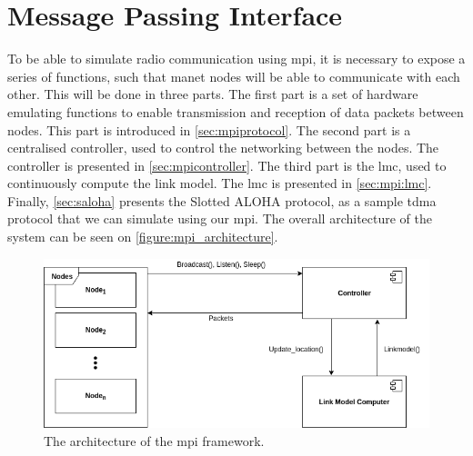 \chapter{Message Passing Interface}

To be able to simulate radio communication using \gls{mpi}, it is necessary to expose a series of functions, such that \gls{manet} nodes will be able to communicate with each other. This will be done in three parts. The first part is a set of hardware emulating functions to enable transmission and reception of data packets between nodes. This part is introduced in \autoref{sec:mpiprotocol}. The second part is a centralised controller, used to control the networking between the nodes. The controller is presented in \autoref{sec:mpicontroller}. The third part is the \acrfull{lmc}, used to continuously compute the link model. The \acrlong{lmc} is presented in \autoref{sec:mpi:lmc}. Finally, \autoref{sec:saloha} presents the Slotted ALOHA protocol, as a sample \gls{tdma} protocol that we can simulate using our \gls{mpi}. The overall architecture of the system can be seen on \autoref{figure:mpi_architecture}.

\begin{figure}[ht]
    \centering
    \includegraphics[width=\textwidth]{figures/mpi_architecture.png}
    \caption{The architecture of the \gls{mpi} framework.}
    \label{figure:mpi_architecture}
\end{figure}







